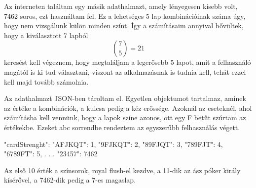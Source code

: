 Az interneten találtam egy másik adathalmazt, amely lényegesen kisebb volt, 7462 soros, ezt használtam fel. 
\cite{chances}
Ez a lehetséges 5 lap kombinációinak száma úgy, hogy nem vizsgálunk külön minden színt. Így a számításaim annyival bővültek, hogy a kiválasztott 7 lapból \[ \binom{7}{5}=21\] keresést kell végeznem, hogy megtaláljam a legerősebb 5 lapot, amit a felhasználó magától is ki tud választani, viszont az alkalmazásnak is tudnia kell, tehát ezzel kell majd tovább számolnia.

Az adathalmazt JSON-ben tároltam el. Egyetlen objektumot tartalmaz, aminek az értéke a kombinációk, a kulcsa pedig a kéz erőssége. Azoknál az eseteknél, ahol számításba kell vennünk, hogy a lapok színe azonos, ott egy F betűt szúrtam az értékekbe. Ezeket abc sorrendbe rendeztem az egyszerűbb felhasználás végett.

\begin{python}
{
  "cardStrenght": {
    "AFJKQT": 1,
    "9FJKQT": 2,
    "89FJQT": 3,
    "789FJT": 4,
    "6789FT": 5,
    .
    .
    .
    "23457": 7462
    }
}
\end{python}

Az első 10 érték a színsorok, royal flush-el kezdve, a 11-dik az ász póker király kísérővel, a 7462-dik pedig a 7-es magaslap.